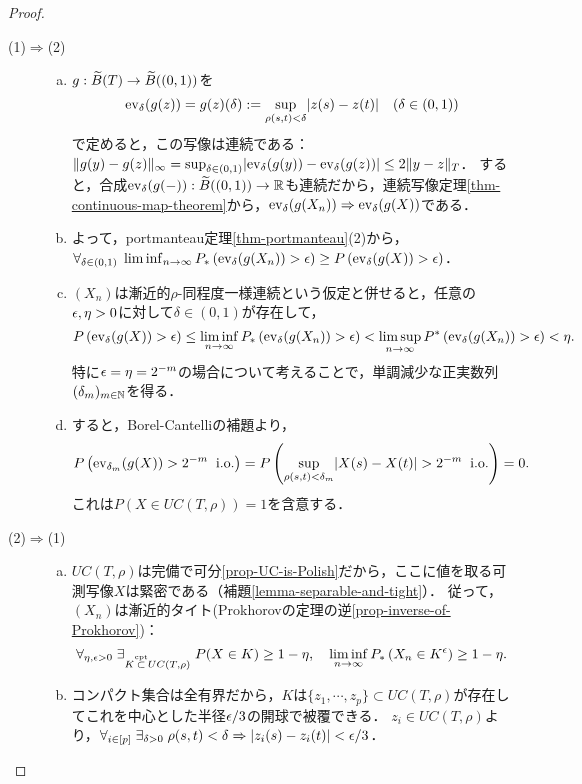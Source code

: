 \documentclass[uplatex,dvipdfmx]{jsreport}
\begin{document}
\begin{proof}\mbox{}
    \begin{description}
        \item[(1)$\Rightarrow$(2)] 
        \begin{enumerate}[(a)]
            \item $g:\widetilde{B}(T)\to\widetilde{B}((0,1))$を
            \[\mathrm{ev}_\delta(g(z))=g(z)(\delta):=\sup_{\rho(s,t)<\delta}\lvert z(s)-z(t)\rvert\quad(\delta\in(0,1))\]
            で定めると，この写像は連続である：$\|g(y)-g(z)\|_\infty=\sup_{\delta\in(0,1)}\lvert\mathrm{ev}_\delta(g(y))-\mathrm{ev}_\delta(g(z))\rvert\le 2\|y-z\|_T$．
            すると，合成$\mathrm{ev}_{\delta}(g(-)):\widetilde{B}((0,1))\to\mathbb{R}$も連続だから，連続写像定理\ref{thm-continuous-map-theorem}から，$\mathrm{ev}_\delta(g(X_n))\Rightarrow\mathrm{ev}_\delta(g(X))$である．
            \item よって，portmanteau定理\ref{thm-portmanteau}(2)から，$\forall_{\delta\in(0,1)}\;\liminf_{n\to\infty} P_*\left(\mathrm{ev}_\delta(g(X_n))>\epsilon\right)\ge P\left(\mathrm{ev}_\delta(g(X))>\epsilon\right)$．
            \item $(X_n)$は漸近的$\rho$-同程度一様連続という仮定と併せると，任意の$\epsilon,\eta>0$に対して$\delta\in(0,1)$が存在して，
            \[P\left(\mathrm{ev}_\delta(g(X))>\epsilon\right)\le \liminf_{n\to\infty} P_*\left(\mathrm{ev}_\delta(g(X_n))>\epsilon\right)<\limsup_{n\to\infty} P^*\left(\mathrm{ev}_\delta(g(X_n))>\epsilon\right)<\eta.\]
            特に$\epsilon=\eta=2^{-m}$の場合について考えることで，単調減少な正実数列$(\delta_m)_{m\in\mathbb{N}}$を得る．
            \item すると，Borel-Cantelliの補題より，
            \[P\left(\mathrm{ev}_{\delta_m}(g(X))>2^{-m}\;\;\mathrm{i.o.}\right)=P\left(\sup_{\rho(s,t)<\delta_m}\lvert X(s)-X(t)\rvert>2^{-m}\;\;\mathrm{i.o.}\right)=0.\]
            これは$P(X\in UC(T,\rho))=1$を含意する．
        \end{enumerate}
        \item[(2)$\Rightarrow$(1)] \begin{enumerate}[(a)]
            \item $UC(T,\rho)$は完備で可分\ref{prop-UC-is-Polish}だから，ここに値を取る可測写像$X$は緊密である（補題\ref{lemma-separable-and-tight}）．
            従って，$(X_n)$は漸近的タイト(Prokhorovの定理の逆\ref{prop-inverse-of-Prokhorov})：\[\forall_{\eta,\epsilon>0}\;\exists_{K\overset{\textrm{cpt}}{\subset} UC(T,\rho)}\;P(X\in K)\ge 1-\eta,\quad\liminf_{n\to\infty} P_*\left(X_n\in K^\epsilon\right)\ge 1-\eta.\]
            \item コンパクト集合は全有界だから，$K$は$\{z_1,\cdots,z_p\}\subset UC(T,\rho)$が存在してこれを中心とした半径$\epsilon/3$の開球で被覆できる．
            $z_i\in UC(T,\rho)$より，$\forall_{i\in[p]}\;\exists_{\delta>0}\;\rho(s,t)<\delta\Rightarrow\lvert z_i(s)-z_i(t)\rvert<\epsilon/3$．

\end{enumerate}
\end{description}
\end{proof}
\end{document}
